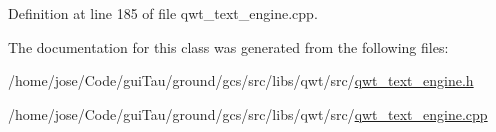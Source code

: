 Definition at line 185 of file qwt\-\_\-text\-\_\-engine.\-cpp.



The documentation for this class was generated from the following files\-:\begin{DoxyCompactItemize}
\item 
/home/jose/\-Code/gui\-Tau/ground/gcs/src/libs/qwt/src/\hyperlink{qwt__text__engine_8h}{qwt\-\_\-text\-\_\-engine.\-h}\item 
/home/jose/\-Code/gui\-Tau/ground/gcs/src/libs/qwt/src/\hyperlink{qwt__text__engine_8cpp}{qwt\-\_\-text\-\_\-engine.\-cpp}\end{DoxyCompactItemize}
